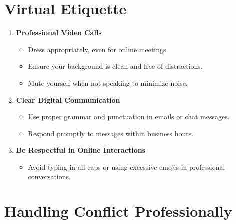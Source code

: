 \documentclass[
  letterpaper,
  DIV=11,
  numbers=noendperiod]{scrreprt}
\providecommand{\tightlist}{%
  \setlength{\itemsep}{0pt}\setlength{\parskip}{0pt}}\usepackage{longtable,booktabs,array}
\begin{document}
\section{Virtual Etiquette}\label{virtual-etiquette}

\begin{enumerate}
\def\labelenumi{\arabic{enumi}.}
\item
  \textbf{Professional Video Calls}

  \begin{itemize}
  \tightlist
  \item
    Dress appropriately, even for online meetings.
  \item
    Ensure your background is clean and free of distractions.
  \item
    Mute yourself when not speaking to minimize noise.
  \end{itemize}
\item
  \textbf{Clear Digital Communication}

  \begin{itemize}
  \tightlist
  \item
    Use proper grammar and punctuation in emails or chat messages.
  \item
    Respond promptly to messages within business hours.
  \end{itemize}
\item
  \textbf{Be Respectful in Online Interactions}

  \begin{itemize}
  \tightlist
  \item
    Avoid typing in all caps or using excessive emojis in professional
    conversations.
  \end{itemize}
\end{enumerate}

\section{Handling Conflict
Professionally}\label{handling-conflict-professionally}
\end{document}
